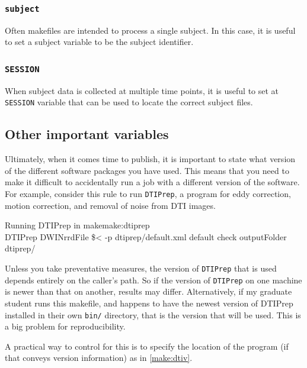 
\subsubsection{\texttt{subject}}
Often makefiles are intended to process a single subject. In this case, it is useful to set a subject variable to be the subject identifier.

\subsubsection{\texttt{SESSION}}
When subject data is collected at multiple time points, it is useful to set at \texttt{SESSION} variable that can be used to locate the correct subject files. 

\subsection{Other important variables}
Ultimately, when it comes time to publish, it is important to state what version of the different software packages you have used. This means that you need to make it difficult to accidentally run a job with a different version of the software. For example, consider this rule to run \texttt{DTIPrep}, a program for eddy correction, motion correction, and removal of noise from DTI images. %

\begin{make}{Running DTIPrep in make}{make:dtiprep}
	 \\
	\tab DTIPrep \dd DWINrrdFile \$< -p dtiprep/default.xml \dd default \dd check \dd outputFolder dtiprep/ \\
\end{make}

Unless you take preventative measures, the version of \texttt{DTIPrep} that is used depends entirely on the caller's path. So if the version of \texttt{DTIPrep} on one machine is newer than that on another, results may differ. Alternatively, if my graduate student runs this makefile, and happens to have the newest version of DTIPrep installed in their own \texttt{bin/} directory, that is the version that will be used. This is a big problem for reproducibility.

A practical way to control for this is to specify the location of the program (if that conveys version information) as in \autoref{make:dtiv}.

